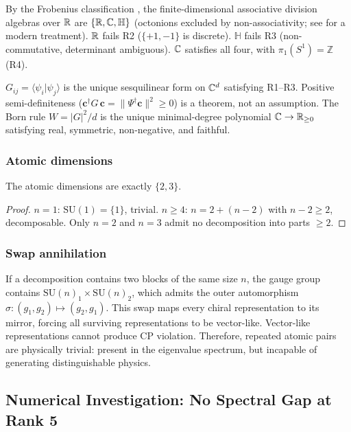 By the Frobenius classification \cite{Frobenius, Hurwitz}, the
finite-dimensional associative division algebras over $\mathbb{R}$ are
$\{\mathbb{R}, \mathbb{C}, \mathbb{H}\}$ (octonions excluded by
non-associativity; see \cite{Baez} for a modern treatment). $\mathbb{R}$ fails R2 ($\{+1,-1\}$ is discrete). $\mathbb{H}$ fails R3 (non-commutative, determinant ambiguous). $\mathbb{C}$ satisfies all four, with $\pi_1(S^1) = \mathbb{Z}$ (R4).

\begin{remark}
$G_{ij} = \langle\psi_i|\psi_j\rangle$ is the unique sesquilinear form on $\mathbb{C}^d$ satisfying R1--R3. Positive semi-definiteness ($\mathbf{c}^\dagger G\,\mathbf{c} = \|\Psi^\dagger\mathbf{c}\|^2 \geq 0$) is a theorem, not an assumption. The Born rule $W = |G|^2/d$ is the unique minimal-degree polynomial $\mathbb{C} \to \mathbb{R}_{\geq 0}$ satisfying real, symmetric, non-negative, and faithful.
\end{remark}

\subsubsection{Atomic dimensions}

\begin{lemma}
The atomic dimensions are exactly $\{2, 3\}$.
\end{lemma}

\begin{proof}
$n = 1$: $\text{SU}(1) = \{1\}$, trivial. $n \geq 4$: $n = 2 + (n-2)$ with $n-2 \geq 2$, decomposable. Only $n = 2$ and $n = 3$ admit no decomposition into parts $\geq 2$.
\end{proof}

\subsubsection{Swap annihilation}

If a decomposition contains two blocks of the same size $n$, the gauge group contains $\text{SU}(n)_1 \times \text{SU}(n)_2$, which admits the outer automorphism $\sigma: (g_1, g_2) \mapsto (g_2, g_1)$. This swap maps every chiral representation to its mirror, forcing all surviving representations to be vector-like. Vector-like representations cannot produce CP violation. Therefore, repeated atomic pairs are physically trivial: present in the eigenvalue spectrum, but incapable of generating distinguishable physics.

\subsection{Numerical Investigation: No Spectral Gap at Rank 5}

